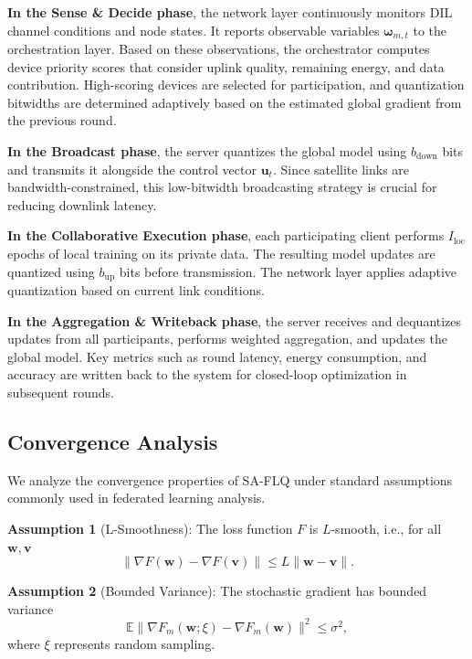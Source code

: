 \documentclass[journal]{IEEEtran}
\begin{document}
\textbf{In the Sense \& Decide phase}, the network layer continuously monitors DIL channel conditions and node states. It reports observable variables $\boldsymbol{\omega}_{m,t}$ to the orchestration layer. Based on these observations, the orchestrator computes device priority scores that consider uplink quality, remaining energy, and data contribution. High-scoring devices are selected for participation, and quantization bitwidths are determined adaptively based on the estimated global gradient from the previous round.

\textbf{In the Broadcast phase}, the server quantizes the global model using $b_{\text{down}}$ bits and transmits it alongside the control vector $\mathbf{u}_t$. Since satellite links are bandwidth-constrained, this low-bitwidth broadcasting strategy is crucial for reducing downlink latency.

\textbf{In the Collaborative Execution phase}, each participating client performs $I_{\text{loc}}$ epochs of local training on its private data. The resulting model updates are quantized using $b_{\text{up}}$ bits before transmission. The network layer applies adaptive quantization based on current link conditions.

\textbf{In the Aggregation \& Writeback phase}, the server receives and dequantizes updates from all participants, performs weighted aggregation, and updates the global model. Key metrics such as round latency, energy consumption, and accuracy are written back to the system for closed-loop optimization in subsequent rounds.



\subsection{Convergence Analysis}
We analyze the convergence properties of SA-FLQ under standard assumptions commonly used in federated learning analysis.

\textbf{Assumption 1} (L-Smoothness): The loss function $F$ is $L$-smooth, i.e., for all $\mathbf{w}, \mathbf{v}$
\begin{equation}
    \|\nabla F(\mathbf{w}) - \nabla F(\mathbf{v})\| \leq L\|\mathbf{w} - \mathbf{v}\|.
\end{equation}

\textbf{Assumption 2} (Bounded Variance): The stochastic gradient has bounded variance
\begin{equation}
    \mathbb{E}\|\nabla F_m(\mathbf{w}; \xi) - \nabla F_m(\mathbf{w})\|^2 \leq \sigma^2,
\end{equation}
where $\xi$ represents random sampling.
\end{document}
